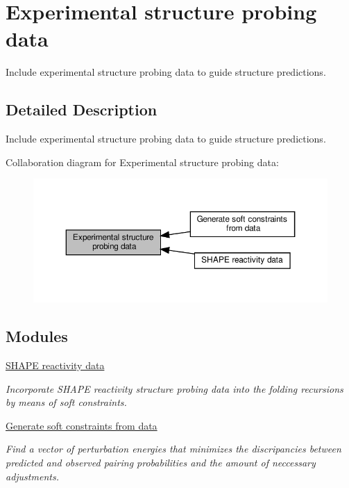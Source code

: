 \hypertarget{group__probing__data}{}\section{Experimental structure probing data}
\label{group__probing__data}


Include experimental structure probing data to guide structure predictions.  




\subsection{Detailed Description}
Include experimental structure probing data to guide structure predictions. 

Collaboration diagram for Experimental structure probing data\+:
\nopagebreak
\begin{figure}[H]
\begin{center}
\leavevmode
\includegraphics[width=350pt]{group__probing__data}
\end{center}
\end{figure}
\subsection*{Modules}
\begin{DoxyCompactItemize}
\item 
\hyperlink{group__SHAPE__reactivities}{S\+H\+A\+P\+E reactivity data}
\begin{DoxyCompactList}\small\item\em Incorporate S\+H\+A\+PE reactivity structure probing data into the folding recursions by means of soft constraints. \end{DoxyCompactList}\item 
\hyperlink{group__perturbation}{Generate soft constraints from data}
\begin{DoxyCompactList}\small\item\em Find a vector of perturbation energies that minimizes the discripancies between predicted and observed pairing probabilities and the amount of neccessary adjustments. \end{DoxyCompactList}\end{DoxyCompactItemize}
